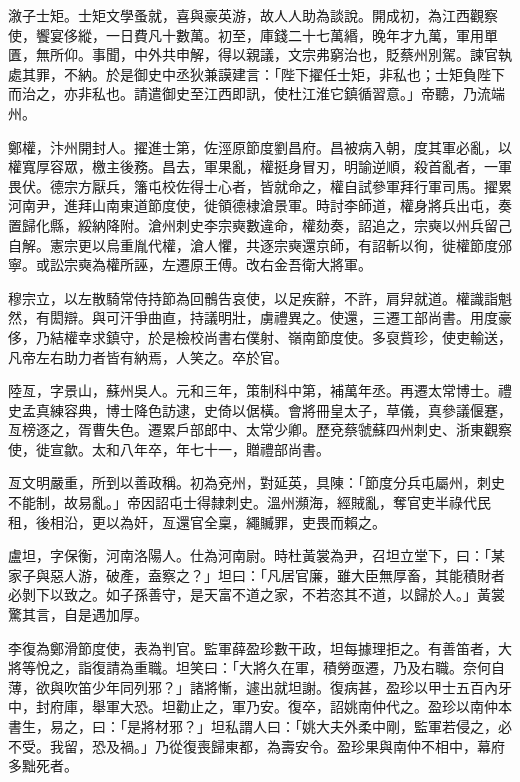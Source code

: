 \begin{pinyinscope}
 漵子士矩。士矩文學蚤就，喜與豪英游，故人人助為談說。開成初，為江西觀察使，饗宴侈縱，一日費凡十數萬。初至，庫錢二十七萬緡，晚年才九萬，軍用單匱，無所仰。事聞，中外共申解，得以親議，文宗弗窮治也，貶蔡州別駕。諫官執處其罪，不納。於是御史中丞狄兼謨建言：「陛下擢任士矩，非私也；士矩負陛下而治之，亦非私也。請遣御史至江西即訊，使杜江淮它鎮循習意。」帝聽，乃流端州。



 鄭權，汴州開封人。擢進士第，佐涇原節度劉昌府。昌被病入朝，度其軍必亂，以權寬厚容眾，檄主後務。昌去，軍果亂，權挺身冒刃，明諭逆順，殺首亂者，一軍畏伏。德宗方厭兵，籓屯校佐得士心者，皆就命之，權自試參軍拜行軍司馬。擢累河南尹，進拜山南東道節度使，徙領德棣滄景軍。時討李師道，權身將兵出屯，奏置歸化縣，綏納降附。滄州刺史李宗奭數違命，權劾奏，詔追之，宗奭以州兵留己自解。憲宗更以烏重胤代權，滄人懼，共逐宗奭還京師，有詔斬以徇，徙權節度邠寧。或訟宗奭為權所誣，左遷原王傅。改右金吾衛大將軍。



 穆宗立，以左散騎常侍持節為回鶻告哀使，以足疾辭，不許，肩舁就道。權識詣魁然，有閎辯。與可汗爭曲直，持議明壯，虜禮異之。使還，三遷工部尚書。用度豪侈，乃結權幸求鎮守，於是檢校尚書右僕射、嶺南節度使。多裒貲珍，使吏輸送，凡帝左右助力者皆有納焉，人笑之。卒於官。



 陸亙，字景山，蘇州吳人。元和三年，策制科中第，補萬年丞。再遷太常博士。禮史孟真練容典，博士降色訪逮，史倚以倨橫。會將冊皇太子，草儀，真參議偃蹇，亙榜逐之，胥曹失色。遷累戶部郎中、太常少卿。歷兗蔡虢蘇四州刺史、浙東觀察使，徙宣歙。太和八年卒，年七十一，贈禮部尚書。



 亙文明嚴重，所到以善政稱。初為兗州，對延英，具陳：「節度分兵屯屬州，刺史不能制，故易亂。」帝因詔屯士得隸刺史。溫州瀕海，經賊亂，奪官吏半祿代民租，後相沿，更以為奸，亙還官全稟，繩贓罪，吏畏而賴之。



 盧坦，字保衡，河南洛陽人。仕為河南尉。時杜黃裳為尹，召坦立堂下，曰：「某家子與惡人游，破產，盍察之？」坦曰：「凡居官廉，雖大臣無厚畜，其能積財者必剝下以致之。如子孫善守，是天富不道之家，不若恣其不道，以歸於人。」黃裳驚其言，自是遇加厚。



 李復為鄭滑節度使，表為判官。監軍薛盈珍數干政，坦每據理拒之。有善笛者，大將等悅之，詣復請為重職。坦笑曰：「大將久在軍，積勞亟遷，乃及右職。奈何自薄，欲與吹笛少年同列邪？」諸將慚，遽出就坦謝。復病甚，盈珍以甲士五百內牙中，封府庫，舉軍大恐。坦勸止之，軍乃安。復卒，詔姚南仲代之。盈珍以南仲本書生，易之，曰：「是將材邪？」坦私謂人曰：「姚大夫外柔中剛，監軍若侵之，必不受。我留，恐及禍。」乃從復喪歸東都，為壽安令。盈珍果與南仲不相中，幕府多黜死者。




\end{pinyinscope}
